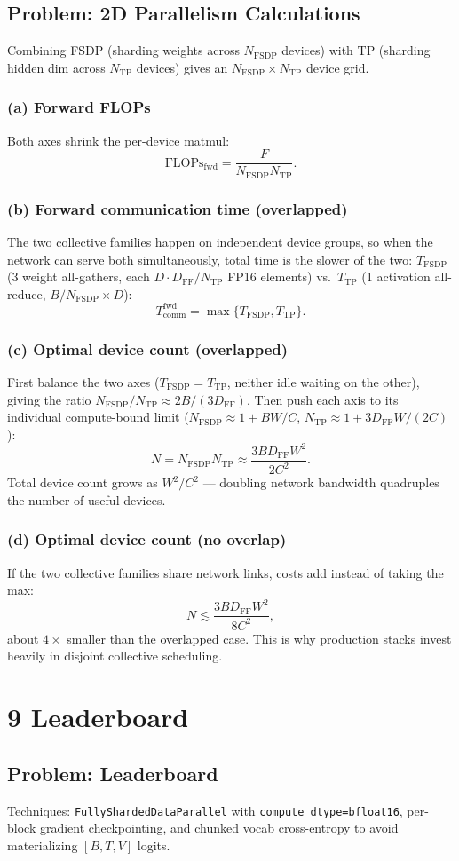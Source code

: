 \documentclass[11pt]{article}
\newcommand{\question}[1]{\subsection*{#1}}
\newcommand{\subquestion}[1]{\subsubsection*{#1}}
\begin{document}
\question{Problem: 2D Parallelism Calculations}
Combining FSDP (sharding weights across $N_{\mathrm{FSDP}}$ devices) with TP (sharding hidden dim across $N_{\mathrm{TP}}$ devices) gives an $N_{\mathrm{FSDP}} \times N_{\mathrm{TP}}$ device grid.

\subquestion{(a) Forward FLOPs}
Both axes shrink the per-device matmul:
\[ \mathrm{FLOPs}_{\mathrm{fwd}} = \frac{F}{N_{\mathrm{FSDP}} N_{\mathrm{TP}}}. \]

\subquestion{(b) Forward communication time (overlapped)}
The two collective families happen on independent device groups, so when the network can serve both simultaneously, total time is the slower of the two: $T_{\mathrm{FSDP}}$ (3 weight all-gathers, each $D \cdot D_{\mathrm{FF}}/N_{\mathrm{TP}}$ FP16 elements) vs.\ $T_{\mathrm{TP}}$ (1 activation all-reduce, $B/N_{\mathrm{FSDP}} \times D$):
\[ T_{\mathrm{comm}}^{\mathrm{fwd}} = \max\{T_{\mathrm{FSDP}}, T_{\mathrm{TP}}\}. \]

\subquestion{(c) Optimal device count (overlapped)}
First balance the two axes ($T_{\mathrm{FSDP}} = T_{\mathrm{TP}}$, neither idle waiting on the other), giving the ratio $N_{\mathrm{FSDP}}/N_{\mathrm{TP}} \approx 2B/(3D_{\mathrm{FF}})$. Then push each axis to its individual compute-bound limit ($N_{\mathrm{FSDP}} \approx 1 + BW/C$, $N_{\mathrm{TP}} \approx 1 + 3D_{\mathrm{FF}}W/(2C)$):
\[ N = N_{\mathrm{FSDP}} N_{\mathrm{TP}} \approx \frac{3BD_{\mathrm{FF}}W^{2}}{2C^{2}}. \]
Total device count grows as $W^2/C^2$ --- doubling network bandwidth quadruples the number of useful devices.

\subquestion{(d) Optimal device count (no overlap)}
If the two collective families share network links, costs add instead of taking the max:
\[ N \lesssim \frac{3BD_{\mathrm{FF}}W^{2}}{8C^{2}}, \]
about $4\times$ smaller than the overlapped case. This is why production stacks invest heavily in disjoint collective scheduling.

\section*{9 Leaderboard}

\question{Problem: Leaderboard}
Techniques: \texttt{FullyShardedDataParallel} with \texttt{compute\_dtype=bfloat16}, per-block gradient checkpointing, and chunked vocab cross-entropy to avoid materializing $[B,T,V]$ logits.

\begin{table}[H]
  \centering
  
  \caption{Best leaderboard timing ($2\times$B200, Modal).}
  \label{tab:leaderboard-8b}
\end{table}
\end{document}
